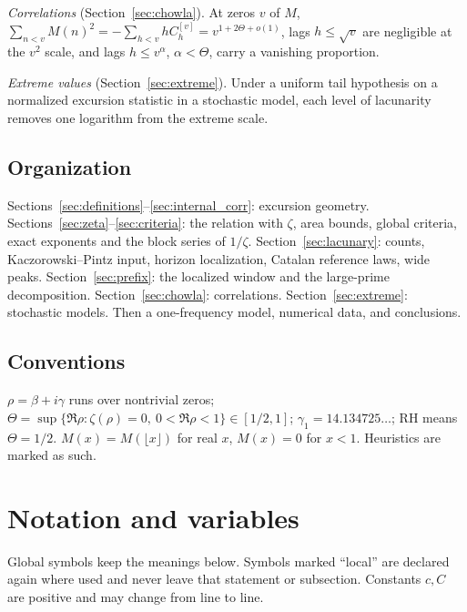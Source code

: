 \documentclass[11pt]{amsart}
\numberwithin{equation}{section}
\theoremstyle{plain}
\theoremstyle{definition}
\theoremstyle{remark}
\begin{document}
\emph{Correlations} (Section~\ref{sec:chowla}). At zeros $v$ of $M$,
$\sum_{n<v}M(n)^2=-\sum_{h<v}hC_h^{[v]}=v^{1+2\Theta+o(1)}$, lags
$h\le\sqrt v$ are negligible at the $v^2$ scale, and lags $h\le v^\alpha$,
$\alpha<\Theta$, carry a vanishing proportion.

\emph{Extreme values} (Section~\ref{sec:extreme}). Under a uniform tail
hypothesis on a normalized excursion statistic in a stochastic model, each
level of lacunarity removes one logarithm from the extreme scale.

\subsection{Organization}
\label{subsec:organization}
Sections~\ref{sec:definitions}--\ref{sec:internal_corr}: excursion geometry.
Sections~\ref{sec:zeta}--\ref{sec:criteria}: the relation with $\zeta$, area
bounds, global criteria, exact exponents and the block series of $1/\zeta$.
Section~\ref{sec:lacunary}: counts, Kaczorowski--Pintz input, horizon
localization, Catalan reference laws, wide peaks.
Section~\ref{sec:prefix}: the localized window and the large-prime
decomposition. Section~\ref{sec:chowla}: correlations.
Section~\ref{sec:extreme}: stochastic models. Then a one-frequency model,
numerical data, and conclusions.

\subsection*{Conventions}
$\rho=\beta+i\gamma$ runs over nontrivial zeros;
$\Theta=\sup\{\Re\rho:\zeta(\rho)=0,\ 0<\Re\rho<1\}\in[1/2,1]$;
$\gamma_1=14.134725\ldots$; RH means $\Theta=1/2$. $M(x)=M(\lfloor x\rfloor)$
for real $x$, $M(x)=0$ for $x<1$. Heuristics are marked as such.

\section{Notation and variables}
\label{sec:notation}

Global symbols keep the meanings below. Symbols marked ``local'' are
declared again where used and never leave that statement or subsection.
Constants $c,C$ are positive and may change from line to line.
\end{document}
